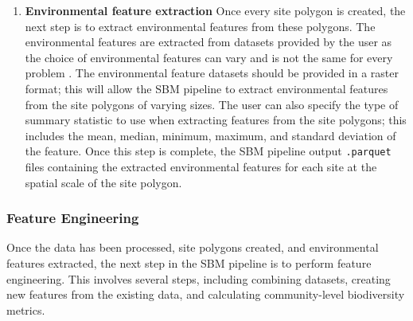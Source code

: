 \begin{enumerate}
Site polygon creation involves creating polygons around each unique latitude and longitude pair in the dataset at different scales. This is done because biodiversity datasets usually vary in spatial scale \parencite{sicacha-parada2022} and we want to capture the surrounding environment across a range of spatial scales. The polygons are also created so we can later extract environmental features from them. The user can define the radius for the site polygons as well as the shape of these polygons. If the dataset contains coordinate uncertainty information, then the pipeline will also create polygons with a radius equal to the coordinate uncertainty value for each site. These polygons are projected both in a global coordinate reference system (CRS) and a local CRS, which is determined by the latitude and longitude values of each site. The global CRS, EPSG:4326, is used for extracting environmental features, while the local CRS in UTM format can be used later for visualizations. All these polygons are saved as \texttt{.shp} files for later use in the pipeline.

\item \textbf{Environmental feature extraction}
Once every site polygon is created, the next step is to extract environmental features from these polygons. The environmental features are extracted from datasets provided by the user as the choice of environmental features can vary and is not the same for every problem \parencite{williams2012}. The environmental feature datasets should be provided in a raster format; this will allow the SBM pipeline to extract environmental features from the site polygons of varying sizes. The user can also specify the type of summary statistic to use when extracting features from the site polygons; this includes the mean, median, minimum, maximum, and standard deviation of the feature. Once this step is complete, the SBM pipeline output \texttt{.parquet} files containing the extracted environmental features for each site at the spatial scale of the site polygon.
\end{enumerate}

\subsubsection{Feature Engineering}\label{subsubsec:feature_engineering}

Once the data has been processed, site polygons created, and environmental features extracted, the next step in the SBM pipeline is to perform feature engineering. This involves several steps, including combining datasets, creating new features from the existing data, and calculating community-level biodiversity metrics.

